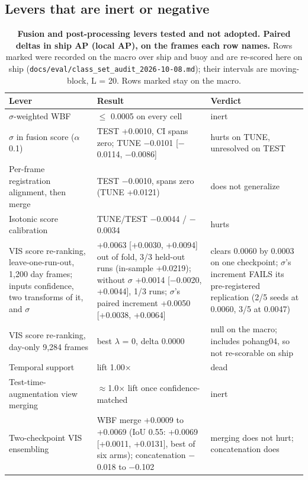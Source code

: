 \documentclass[10pt]{article}
\begin{document}
\subsection{Levers that are inert or negative}\label{app:E.4}
\begin{table}[htbp]
\centering
\footnotesize
\caption{\textbf{Fusion and post-processing levers tested and not adopted. Paired deltas in ship AP (local AP), on the frames each row names.} Rows marked \textdagger{} were recorded on the macro over ship and buoy and are re-scored here on ship (\texttt{docs/\allowbreak{}eval/\allowbreak{}class\_\allowbreak{}set\_\allowbreak{}audit\_\allowbreak{}2026-10-08.md}); their intervals are moving-block, L = 20. Rows marked \textdaggerdbl{} stay on the macro.}
\label{tab:14}
\begin{tabularx}{\linewidth}{>{\raggedright\arraybackslash}X>{\raggedright\arraybackslash}X>{\raggedright\arraybackslash}X}
\toprule
Lever & Result & Verdict \\
\midrule
$\sigma$-weighted WBF \textdagger{} & $\leq$ 0.0005 on every cell & inert \\
$\sigma$ in fusion score ($\alpha$ 0.1) & TEST +0.0010, CI spans zero; TUNE $-$0.0101 [$-$0.0114, $-$0.0086] & hurts on TUNE, unresolved on TEST \\
Per-frame registration alignment, then merge & TEST $-$0.0010, spans zero (TUNE +0.0121) & does not generalize \\
Isotonic score calibration & TUNE/TEST $-$0.0044 / $-$0.0034 & hurts \\
VIS score re-ranking, leave-one-run-out, 1,200 day frames; inputs confidence, two transforms of it, and $\sigma$ \textdagger{} & +0.0063 [+0.0030, +0.0094] out of fold, 3/3 held-out runs (in-sample +0.0219); without $\sigma$ +0.0014 [$-$0.0020, +0.0044], 1/3 runs; $\sigma$'s paired increment +0.0050 [+0.0038, +0.0064] & clears 0.0060 by 0.0003 on one checkpoint; $\sigma$'s increment FAILS its pre-registered replication (2/5 seeds at 0.0060, 3/5 at 0.0047) \\
VIS score re-ranking, day-only 9,284 frames \textdaggerdbl{} & best $\lambda$ = 0, delta 0.0000 & null on the macro; includes pohang04, so not re-scorable on ship \\
Temporal support \textdagger{} & lift 1.00$\times$ & dead \\
Test-time-augmentation view merging \textdagger{} & $\approx$1.0$\times$ lift once confidence-matched & inert \\
Two-checkpoint VIS ensembling \textdagger{} & WBF merge +0.0009 to +0.0069 (IoU 0.55: +0.0069 [+0.0011, +0.0131], best of six arms); concatenation $-$0.018 to $-$0.102 & merging does not hurt; concatenation does \\

\end{tabularx}
\end{table}
\end{document}
